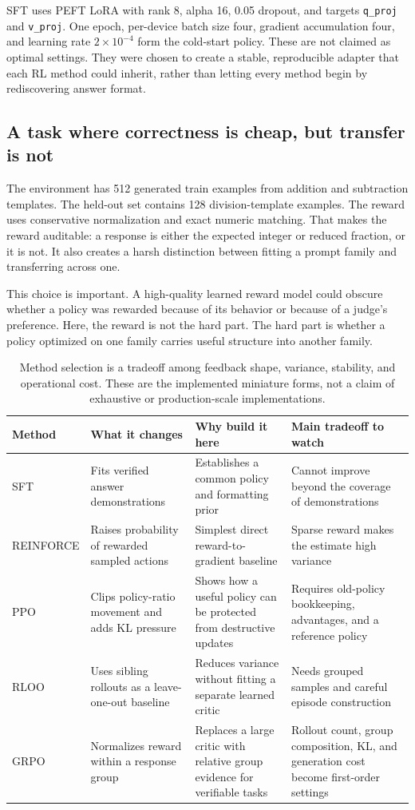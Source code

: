 \documentclass[10pt]{article}
\begin{document}
SFT uses PEFT LoRA with rank 8, alpha 16, 0.05 dropout, and targets \texttt{q\_proj} and \texttt{v\_proj}. One epoch, per-device batch size four, gradient accumulation four, and learning rate $2\times10^{-4}$ form the cold-start policy. These are not claimed as optimal settings. They were chosen to create a stable, reproducible adapter that each RL method could inherit, rather than letting every method begin by rediscovering answer format.

\subsection{A task where correctness is cheap, but transfer is not}
The environment has 512 generated train examples from addition and subtraction templates. The held-out set contains 128 division-template examples. The reward uses conservative normalization and exact numeric matching. That makes the reward auditable: a response is either the expected integer or reduced fraction, or it is not. It also creates a harsh distinction between fitting a prompt family and transferring across one.

This choice is important. A high-quality learned reward model could obscure whether a policy was rewarded because of its behavior or because of a judge's preference. Here, the reward is not the hard part. The hard part is whether a policy optimized on one family carries useful structure into another family.

\begin{table}[t]
\centering\small
\caption{Method selection is a tradeoff among feedback shape, variance, stability, and operational cost. These are the implemented miniature forms, not a claim of exhaustive or production-scale implementations.}
\begin{tabularx}{\textwidth}{p{} p{} p{} X}
\toprule
Method & What it changes & Why build it here & Main tradeoff to watch \\
\midrule
SFT & Fits verified answer demonstrations & Establishes a common policy and formatting prior & Cannot improve beyond the coverage of demonstrations \\
REINFORCE & Raises probability of rewarded sampled actions & Simplest direct reward-to-gradient baseline & Sparse reward makes the estimate high variance \\
PPO & Clips policy-ratio movement and adds KL pressure & Shows how a useful policy can be protected from destructive updates & Requires old-policy bookkeeping, advantages, and a reference policy \\
RLOO & Uses sibling rollouts as a leave-one-out baseline & Reduces variance without fitting a separate learned critic & Needs grouped samples and careful episode construction \\
GRPO & Normalizes reward within a response group & Replaces a large critic with relative group evidence for verifiable tasks & Rollout count, group composition, KL, and generation cost become first-order settings \\
\bottomrule
\end{tabularx}
\end{table}
\end{document}
